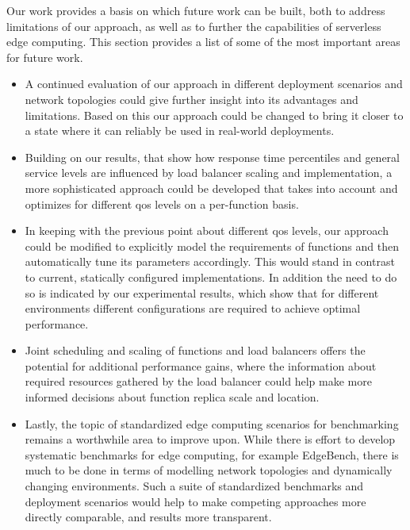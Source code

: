 \documentclass[draft,final]{vutinfth} %
\begin{document}
Our work provides a basis on which future work can be built, both to address limitations of our approach, as well as to further the capabilities of serverless edge computing.
This section provides a list of some of the most important areas for future work.
\begin{itemize}
    \item A continued evaluation of our approach in different deployment scenarios and network topologies could give further insight into its advantages and limitations. Based on this our approach could be changed to bring it closer to a state where it can reliably be used in real-world deployments.
    \item Building on our results, that show how response time percentiles and general service levels are influenced by load balancer scaling and implementation, a more sophisticated approach could be developed that takes into account and optimizes for different \gls{qos} levels on a per-function basis.
    \item In keeping with the previous point about different \gls{qos} levels, our approach could be modified to explicitly model the requirements of functions and then automatically tune its parameters accordingly. This would stand in contrast to current, statically configured implementations. In addition the need to do so is indicated by our experimental results, which show that for different environments different configurations are required to achieve optimal performance.
    \item Joint scheduling and scaling of functions and load balancers offers the potential for additional performance gains, where the information about required resources gathered by the load balancer could help make more informed decisions about function replica scale and location.
    \item Lastly, the topic of standardized edge computing scenarios for benchmarking remains a worthwhile area to improve upon. While there is effort to develop systematic benchmarks for edge computing, for example EdgeBench\cite{edgebench}, there is much to be done in terms of modelling network topologies and dynamically changing environments. Such a suite of standardized benchmarks and deployment scenarios would help to make competing approaches more directly comparable, and results more transparent.

\end{itemize}   
\end{document}

